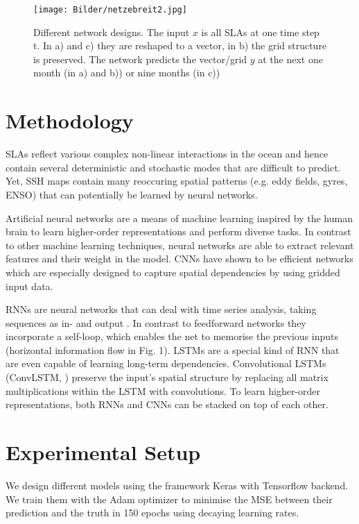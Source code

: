 \documentclass{article}
\renewcommand{\d}[1]{{\mbox{\boldmath$#1$}}}
\begin{document}
\begin{figure*}[h!]
\centering
	\texttt{[image: Bilder/netzebreit2.jpg]}
\vspace{-0.2cm}
\caption{Different network designs. The input \d x is all SLAs at one time step t. In a) and c) they are reshaped to a vector, in b) the grid structure is preserved. The network predicts the vector/grid \d y at the next one month (in a) and b)) or nine months (in c)) 
}
\label{fig:seq}
\end{figure*}

\section{Methodology}
\label{sec:typestyle}

SLAs reflect various complex non-linear interactions in the ocean
and hence contain several deterministic and stochastic modes that are difficult to predict. Yet, SSH maps contain many reoccuring spatial patterns (e.g. eddy fields, gyres, ENSO) that can potentially be learned by neural networks.

Artificial neural networks are a means of machine learning inspired by the human brain to learn higher-order representations  and perform diverse tasks. In contrast to other machine learning techniques, neural networks are able to extract relevant features and their weight in the model. CNNs have shown to be efficient networks which are especially designed to capture spatial dependencies by using gridded input data.

RNNs are neural networks that can deal with time series analysis, taking sequences as in- and output \cite{s23}. In contrast to feedforward networks they incorporate a self-loop, which enables the net to memorise the previous inputs (horizontal information flow in Fig. 1). LSTMs \cite{c11} are a special kind of RNN that are even capable of learning long-term dependencies.
Convolutional LSTMs (ConvLSTM, \cite{c30}) preserve the input's spatial structure by replacing all matrix multiplications within the LSTM with convolutions. 
To learn higher-order representations, both RNNs and CNNs can be stacked on top of each other.



\section{Experimental Setup}

We design different models using the framework Keras \cite{keras} with Tensorflow backend. 
We train them with the Adam optimizer \cite{c12} to minimise the MSE between their prediction and the truth in 150 epochs using decaying learning rates.
\vspace{0.2cm}
\end{document}
